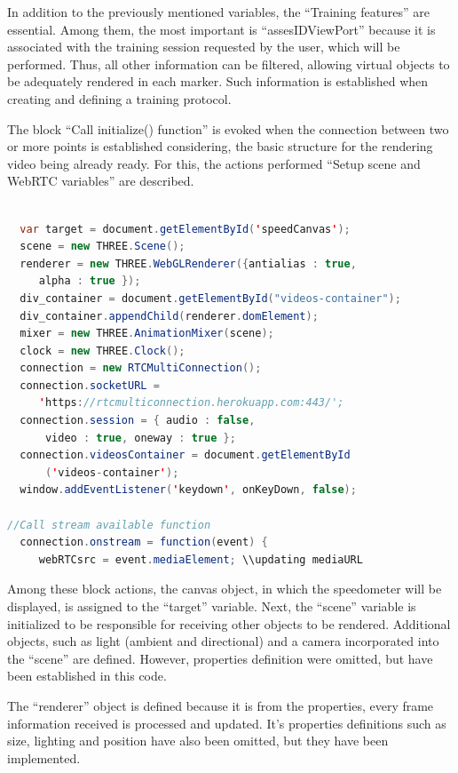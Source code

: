In addition to the previously mentioned variables, the ``Training features'' are essential. Among them, the most important is ``assesIDViewPort'' because it is associated with the training session requested by the user, which will be performed. Thus, all other information can be filtered, allowing virtual objects to be adequately rendered in each marker. Such information is established when creating and defining a training protocol. 

The block ``Call initialize() function'' is evoked when the connection between two or more points is established considering, the basic structure for the rendering video being already ready. For this, the actions performed ``Setup scene and WebRTC variables'' are described. \newline


\begin{lstlisting}[frame=single,language=Java]  % Start your code-block

  var target = document.getElementById('speedCanvas');
  scene = new THREE.Scene();
  renderer = new THREE.WebGLRenderer({antialias : true, 
     alpha : true });
  div_container = document.getElementById("videos-container");
  div_container.appendChild(renderer.domElement);
  mixer = new THREE.AnimationMixer(scene);
  clock = new THREE.Clock();
  connection = new RTCMultiConnection();  
  connection.socketURL = 
     'https://rtcmulticonnection.herokuapp.com:443/';
  connection.session = { audio : false, 
      video : true, oneway : true };
  connection.videosContainer = document.getElementById
      ('videos-container');
  window.addEventListener('keydown', onKeyDown, false);
  
//Call stream available function 
  connection.onstream = function(event) {
     webRTCsrc = event.mediaElement; \\updating mediaURL
\end{lstlisting}

Among these block actions, the canvas object, in which the speedometer will be displayed, is assigned to the ``target'' variable. Next, the ``scene'' variable is initialized to be responsible for receiving other objects to be rendered. Additional objects, such as light (ambient and directional) and a camera incorporated into the ``scene'' are defined. However, properties definition were omitted, but have been established in this code. 

The ``renderer'' object is defined because it is from the properties, every frame information received is processed and updated. It's properties definitions such as size, lighting and position have also been omitted, but they have been implemented. 

